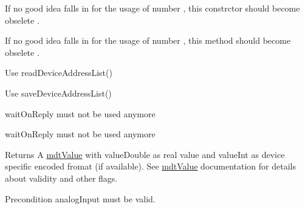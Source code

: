 
\begin{DoxyRefList}
\item[\label{deprecated__deprecated000023}%
\hypertarget{deprecated__deprecated000023}{}%
Member \hyperlink{classmdt_error_a377c175cc8e1aeae543cae2ecc5ca87b}{mdt\-Error\-:\-:mdt\-Error} (int number, const Q\-String \&text, level\-\_\-t level)]If no good idea falls in for the usage of number , this constrctor should become obselete .  
\item[\label{deprecated__deprecated000024}%
\hypertarget{deprecated__deprecated000024}{}%
Member \hyperlink{classmdt_error_ad233adb8efe4180b85f584c5afdd49fc}{mdt\-Error\-:\-:number} () const ]If no good idea falls in for the usage of number , this method should become obselete .  
\item[\label{deprecated__deprecated000021}%
\hypertarget{deprecated__deprecated000021}{}%
Member \hyperlink{classmdt_modbus_tcp_port_manager_ab4d0a994973af6008faf489ca9ddb03d}{mdt\-Modbus\-Tcp\-Port\-Manager\-:\-:read\-Scan\-Result} ()]Use read\-Device\-Address\-List()  
\item[\label{deprecated__deprecated000020}%
\hypertarget{deprecated__deprecated000020}{}%
Member \hyperlink{classmdt_modbus_tcp_port_manager_a3a1f5a54c93fa90ba83dea8785407da3}{mdt\-Modbus\-Tcp\-Port\-Manager\-:\-:save\-Scan\-Result} (const Q\-List$<$ mdt\-Port\-Info $\ast$ $>$ scan\-Result)]Use save\-Device\-Address\-List()  
\item[\label{deprecated__deprecated000009}%
\hypertarget{deprecated__deprecated000009}{}%
Member \hyperlink{classmdt_multi_io_device_a6a2f1e6538f09318b8e7d7fe220195e9}{mdt\-Multi\-Io\-Device\-:\-:get\-Analog\-Inputs} (bool wait\-On\-Reply=true)]wait\-On\-Reply must not be used anymore  
\item[\label{deprecated__deprecated000008}%
\hypertarget{deprecated__deprecated000008}{}%
Member \hyperlink{classmdt_multi_io_device_ac39f01b071d5b7c16e18db298160134d}{mdt\-Multi\-Io\-Device\-:\-:get\-Analog\-Input\-Value} (\hyperlink{classmdt_analog_io}{mdt\-Analog\-Io} $\ast$analog\-Input, bool query\-Device, bool wait\-On\-Reply)]wait\-On\-Reply must not be used anymore \begin{DoxyReturn}{Returns}
A \hyperlink{classmdt_value}{mdt\-Value} with value\-Double as real value and value\-Int as device specific encoded fromat (if available). See \hyperlink{classmdt_value}{mdt\-Value} documentation for details about validity and other flags. 
\end{DoxyReturn}
\begin{DoxyPrecond}{Precondition}
analog\-Input must be valid.  
\end{DoxyPrecond}


\end{DoxyRefList}
